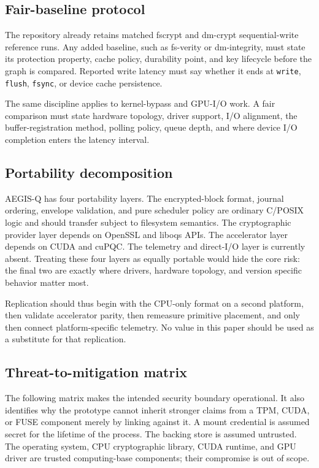 \subsection{Fair-baseline protocol}

The repository already retains matched fscrypt and dm-crypt sequential-write
reference runs.  Any added baseline, such as fs-verity or dm-integrity, must
state its protection property, cache policy, durability point, and key
lifecycle before the graph is compared.  Reported write latency must say
whether it ends at \texttt{write}, \texttt{flush}, \texttt{fsync}, or device
cache persistence.

The same discipline applies to kernel-bypass and GPU-I/O work.  A fair
comparison must state hardware topology, driver support, I/O alignment, the
buffer-registration method, polling policy, queue depth, and where device I/O
completion enters the latency interval.

\subsection{Portability decomposition}

AEGIS-Q has four portability layers.  The encrypted-block format, journal
ordering, envelope validation, and pure scheduler policy are ordinary C/POSIX
logic and should transfer subject to filesystem semantics.  The cryptographic
provider layer depends on OpenSSL and liboqs APIs.  The accelerator layer
depends on CUDA and cuPQC.  The telemetry and direct-I/O layer is currently
absent.  Treating these four layers as equally portable would hide the core
risk: the final two are exactly where drivers, hardware topology, and version
specific behavior matter most.

Replication should thus begin with the CPU-only format on a second platform,
then validate accelerator parity, then remeasure primitive placement, and only
then connect platform-specific telemetry.  No value in this paper should be
used as a substitute for that replication.

\subsection{Threat-to-mitigation matrix}

The following matrix makes the intended security boundary operational.  It
also identifies why the prototype cannot inherit stronger claims from a TPM,
CUDA, or FUSE component merely by linking against it.  A mount credential is
assumed secret for the lifetime of the process.  The backing store is assumed
untrusted.  The operating system, CPU cryptographic library, CUDA runtime, and
GPU driver are trusted computing-base components; their compromise is out of
scope.

